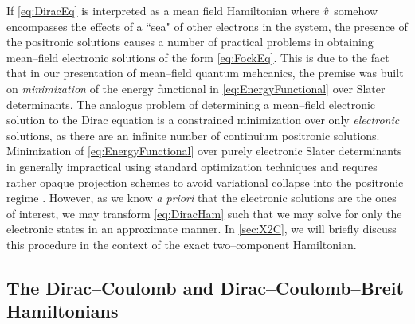 If \cref{eq:DiracEq} is interpreted as a mean field Hamiltonian where $\hat{v}$ somehow encompasses
the effects of a ``sea" of other electrons in the system, the presence of the positronic solutions
causes a number of practical problems in obtaining mean--field electronic solutions of the form
\cref{eq:FockEq}. This is due to the fact that in our presentation of mean--field quantum mehcanics,
the premise was built on \emph{minimization} of the energy functional in \cref{eq:EnergyFunctional}
over Slater determinants. The analogus problem of determining a mean--field electronic solution
to the Dirac equation is a constrained minimization over only \emph{electronic} solutions, 
as there are an infinite number of continuium positronic solutions. Minimization of 
\cref{eq:EnergyFunctional} over purely electronic Slater determinants in generally impractical using standard 
optimization techniques and requres rather opaque projection schemes to avoid variational
collapse into the positronic regime . However, as we know \emph{a priori} that
the electronic solutions are the ones of interest, we may transform \cref{eq:DiracHam} such that
we may solve for only the electronic states in an approximate manner. In \cref{sec:X2C},
we will briefly discuss this procedure in the context of the exact two--component Hamiltonian.

\subsection{The Dirac--Coulomb and Dirac--Coulomb--Breit Hamiltonians}


